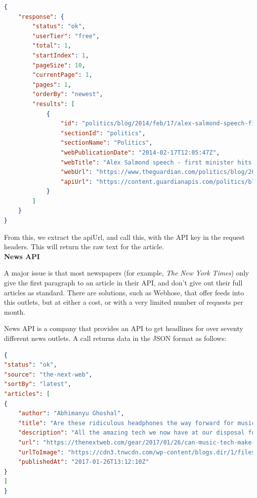 \documentclass[12pt]{article}
\begin{document}
\begin{lstlisting}[language=json, firstnumber=1, caption={A sample response to an API call to The Guardian}]
{
    "response": {
        "status": "ok",
        "userTier": "free",
        "total": 1,
        "startIndex": 1,
        "pageSize": 10,
        "currentPage": 1,
        "pages": 1,
        "orderBy": "newest",
        "results": [
            {
                "id": "politics/blog/2014/feb/17/alex-salmond-speech-first-minister-scottish-independence-eu-currency-live",
                "sectionId": "politics",
                "sectionName": "Politics",
                "webPublicationDate": "2014-02-17T12:05:47Z",
                "webTitle": "Alex Salmond speech - first minister hits back over Scottish independence - live",
                "webUrl": "https://www.theguardian.com/politics/blog/2014/feb/17/alex-salmond-speech-first-minister-scottish-independence-eu-currency-live",
                "apiUrl": "https://content.guardianapis.com/politics/blog/2014/feb/17/alex-salmond-speech-first-minister-scottish-independence-eu-currency-live"
            }
        ]
    }
} 
\end{lstlisting}

From this, we extract the apiUrl, and call this, with the API key in the request headers. This will return the raw text for the article. \\

\textbf{News API}

A major issue is that most newspapers (for example, \emph{The New York Times}\cite{newYorkTimes}) only give the first paragraph to an article in their API, and don't give out their full articles as standard. There are solutions, such as Webhose\cite{webhose}, that offer feeds into this outlets, but at either a cost, or with a very limited number of requests per month. 

News API\cite{newsApi} is a company that provides an API to get headlines for over seventy different news outlets. A call returns data in the JSON format as follows:

\begin{lstlisting}[language=json, firstnumber=1, caption={A sample response to an API call to News API}]
{
"status": "ok",
"source": "the-next-web",
"sortBy": "latest",
"articles": [
{
	"author": "Abhimanyu Ghoshal",
	"title": "Are these ridiculous headphones the way forward for music tech?",
	"description": "All the amazing tech we now have at our disposal for enjoying music is closing us off from other people instead of bringing us together. Is there hope yet?",
	"url": "https://thenextweb.com/gear/2017/01/26/can-music-tech-make-us-sociable-again/",
	"urlToImage": "https://cdn3.tnwcdn.com/wp-content/blogs.dir/1/files/2017/01/Vinci-hed-1.jpg",
	"publishedAt": "2017-01-26T13:12:10Z"
}
]
}
\end{lstlisting}
\end{document}
